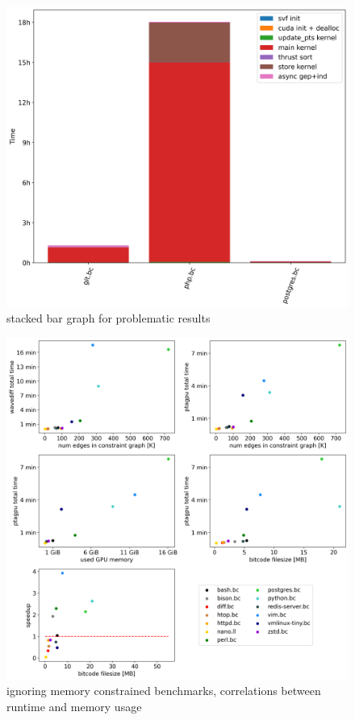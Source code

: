 \begin{figure}
    \centering
    \includegraphics[width=.9\textwidth]{img/stackedbar-problems.png}
    \caption{stacked bar graph for problematic results}
    \label{fig:stackedbar-problem}
\end{figure}

\begin{figure}
    \centering
    \includegraphics[width=.9\textwidth]{img/correlations.png}
    \caption{ignoring memory constrained benchmarks, correlations between runtime and memory usage}
    \label{fig:correlations}
\end{figure}


